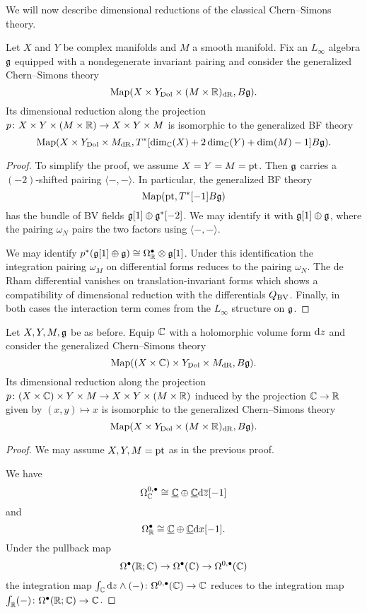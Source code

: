 \documentclass[10pt, oneside]{article}
\begin{document}
We will now describe dimensional reductions of the classical Chern--Simons theory.

\begin{prop} \label{CS_to_BF_diml_red_prop}
Let $X$ and $Y$ be complex manifolds and $M$ a smooth manifold. Fix an $L_\infty$ algebra $\mathfrak g$ equipped with a nondegenerate invariant pairing and consider the generalized Chern--Simons theory
\[\operatorname{Map}(X\times Y_{\mathrm{Dol}}\times (M\times \mathbb R)_{\mathrm{dR}}, B\mathfrak g).\]
Its dimensional reduction along the projection $p\colon X\times Y\times (M\times \mathbb R)\rightarrow X\times Y\times M$ is isomorphic to the generalized BF theory
\[\operatorname{Map}(X\times Y_{\mathrm{Dol}}\times M_{\mathrm{dR}}, T^*[\dim_\mathbb C(X) + 2\dim_\mathbb C(Y) + \dim(M) - 1] B\mathfrak g).\]
\end{prop}

\begin{proof}
To simplify the proof, we assume $X=Y=M=\operatorname{pt}$. Then $\mathfrak g$ carries a $(-2)$-shifted pairing $\langle-,-\rangle$. In particular, the generalized BF theory
\[\operatorname{Map}(\operatorname{pt}, T^*[-1] B \mathfrak g)\]
has the bundle of BV fields $\mathfrak g[1] \oplus \mathfrak g^*[-2]$. We may identify it with $\mathfrak g[1]\oplus \mathfrak g$, where the pairing $\omega_N$ pairs the two factors using $\langle-,-\rangle$.

We may identify $p^*(\mathfrak g[1]\oplus \mathfrak g)\cong \Omega^\bullet_{\mathbb R}\otimes \mathfrak g[1]$. Under this identification the integration pairing $\omega_M$ on differential forms reduces to the pairing $\omega_N$. The de Rham differential vanishes on translation-invariant forms which shows a compatibility of dimensional reduction with the differentials $Q_{\mathrm{BV}}$. Finally, in both cases the interaction term comes from the $L_\infty$ structure on $\mathfrak g$.
\end{proof}

\begin{prop} \label{CS_diml_red_prop}
Let $X,Y,M,\mathfrak g$ be as before. Equip $\mathbb C$ with a holomorphic volume form ${\rm d} z$ and consider the generalized Chern--Simons theory
\[\operatorname{Map}((X\times \mathbb C)\times Y_{\mathrm{Dol}}\times M_{\mathrm{dR}}, B\mathfrak g).\]
Its dimensional reduction along the projection $p\colon (X\times \mathbb C)\times Y\times M\rightarrow X\times Y\times (M\times \mathbb R)$ induced by the projection $\mathbb C\rightarrow \mathbb R$ given by $(x, y)\mapsto x$ is isomorphic to the generalized Chern--Simons theory
\[\operatorname{Map}(X\times Y_{\mathrm{Dol}}\times (M\times \mathbb R)_{\mathrm{dR}}, B\mathfrak g).\]
\end{prop}

\begin{proof}
We may assume $X,Y,M=\operatorname{pt}$ as in the previous proof.

We have
\[\Omega^{0, \bullet}_{\mathbb C}\cong \underline{\mathbb C}\oplus \underline{\mathbb C}{\rm d} \overline{z}[-1]\]
and
\[\Omega^\bullet_{\mathbb R}\cong \underline{\mathbb C}\oplus \underline{\mathbb C} {\rm d} x[-1].\]
Under the pullback map
\[\Omega^\bullet(\mathbb R; \mathbb C)\rightarrow \Omega^\bullet(\mathbb C)\rightarrow \Omega^{0, \bullet}(\mathbb C)\]
the integration map $\int_\mathbb C {\rm d} z\wedge (-)\colon \Omega^{0, \bullet}(\mathbb C)\rightarrow \mathbb C$ reduces to the integration map $\int_\mathbb R (-)\colon \Omega^{\bullet}(\mathbb R;\mathbb C)\rightarrow \mathbb C$.  
\end{proof}
\end{document}

